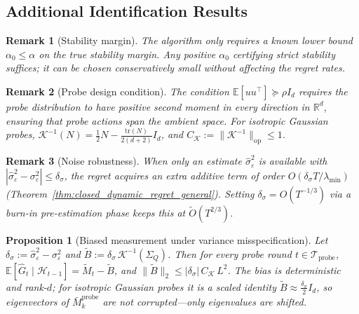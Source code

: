 \documentclass{article}
\newcommand{\R}{\mathbb{R}}
\newcommand{\E}{\mathbb{E}}
\newcommand{\op}{\mathrm{op}}
\newcommand{\cH}{\mathcal{H}}
\newcommand{\cTprobe}{\mathcal{T}_{\mathrm{probe}}}
\newcommand{\tr}{\mathrm{tr}}
\newtheorem{proposition}{Proposition}
\newtheorem{remark}{Remark}
\begin{document}
\subsection{Additional Identification Results}
\label{app:omitted_identification}

\begin{remark}[Stability margin]
\label{rem:stability_margin}
The algorithm only requires a known lower bound $\alpha_0 \le \alpha$ on the true stability margin.
Any positive $\alpha_0$ certifying strict stability suffices;
it can be chosen conservatively small without affecting the
regret rates.  

\end{remark}



\begin{remark}[Probe design condition]
\label{rem:probe_design}
The condition $\E[uu^\top] \succeq \rho I_d$ requires the probe distribution to have positive second moment in every direction in $\R^d$, ensuring that probe actions span the ambient space.
For isotropic Gaussian probes, $\mathcal{K}^{-1}(N) = \frac{1}{2}N - \frac{\tr(N)}{2(d+2)} I_d$, and $C_{\mathcal K} := \|\mathcal{K}^{-1}\|_{\op} \le 1$.
\end{remark}

\begin{remark}[Noise robustness]
\label{rem:noise_robustness}
When only an estimate $\hat\sigma_\varepsilon^2$ is available with $|\hat\sigma_\varepsilon^2 - \sigma_\varepsilon^2| \le \delta_\sigma$, the regret acquires an extra additive term of order $O(\delta_\sigma T/\lambda_{\min})$ (Theorem~\ref{thm:closed_dynamic_regret_general}).
Setting $\delta_\sigma = O(T^{-1/3})$ via a burn-in pre-estimation phase keeps this at $\widetilde O(T^{2/3})$.
\end{remark}

\begin{proposition}[Biased measurement under variance misspecification]
\label{prop:biased_measurement}
Let $\delta_\sigma := \hat\sigma_\varepsilon^2 - \sigma_\varepsilon^2$ and $\widetilde B := \delta_\sigma\,\mathcal K^{-1}(\Sigma_Q)$.
Then for every probe round $t\in\cTprobe$,
$\E[\hat G_t \mid \cH_{t-1}] = \widetilde M_t - \widetilde B$,
and $\|\widetilde B\|_2 \le |\delta_\sigma|\,C_{\mathcal K}\,L^2$.
The bias is deterministic and rank-$d$; for isotropic Gaussian probes it is a scaled identity $\widetilde B \approx \frac{\delta_\sigma}{2}I_d$, so eigenvectors of $\bar M_k^{\mathrm{probe}}$ are not corrupted---only eigenvalues are shifted.
\end{proposition}
\end{document}
